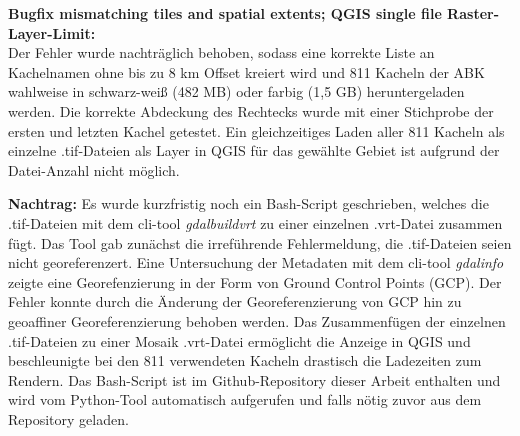 		\textbf{Bugfix mismatching tiles and spatial extents; QGIS single file Raster-Layer-Limit:} \\
		Der Fehler wurde nachträglich behoben, sodass eine korrekte Liste an Kachelnamen ohne bis zu 8 km Offset kreiert wird und 811 Kacheln der ABK wahlweise in schwarz-weiß (482 MB) oder farbig (1,5 GB) heruntergeladen werden. Die korrekte Abdeckung des Rechtecks wurde mit einer Stichprobe der ersten und letzten Kachel getestet. Ein gleichzeitiges Laden aller 811 Kacheln als einzelne .tif-Dateien als Layer in QGIS für das gewählte Gebiet ist aufgrund der Datei-Anzahl nicht möglich.
		
		\textbf{Nachtrag:} Es wurde kurzfristig noch ein Bash-Script geschrieben, welches die .tif-Dateien mit dem cli-tool \textit{gdalbuildvrt} zu einer einzelnen .vrt-Datei zusammen fügt. Das Tool gab zunächst die irreführende Fehlermeldung, die .tif-Dateien seien nicht georeferenzert. Eine Untersuchung der Metadaten mit dem cli-tool \textit{gdalinfo} zeigte eine Georefenzierung in der Form von Ground Control Points (GCP). Der Fehler konnte durch die Änderung der Georeferenzierung von GCP hin zu geoaffiner Georeferenzierung behoben werden. Das Zusammenfügen der einzelnen .tif-Dateien zu einer Mosaik .vrt-Datei ermöglicht die Anzeige in QGIS und beschleunigte bei den 811 verwendeten Kacheln drastisch die Ladezeiten zum Rendern. Das Bash-Script ist im Github-Repository dieser Arbeit enthalten und wird vom Python-Tool automatisch aufgerufen und falls nötig zuvor aus dem Repository geladen.
				
